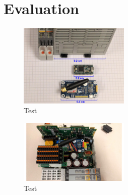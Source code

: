 \section{Evaluation}
\label{sec:evaluation}

\begin{figure}[th]
	\includegraphics[width=0.47\textwidth]{figures/eval_size}
	\centering
	\caption{Test}
	\label{fig:eval_size}
\end{figure}


\begin{figure}[th]
	\includegraphics[width=0.47\textwidth]{figures/eval_a}
	\centering
	\caption{Test}
	\label{fig:eval_a}
\end{figure}

